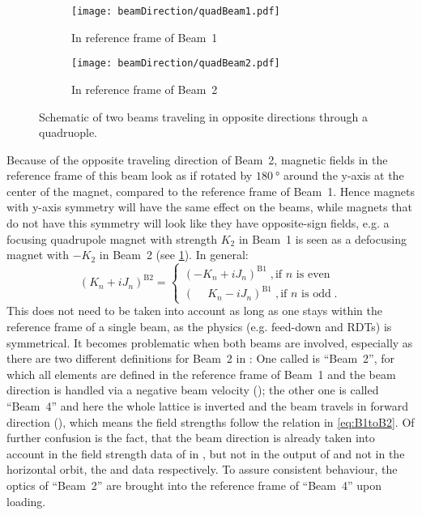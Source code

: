 \begin{figure}[h!]
    \centering
    \begin{subfigure}{0.4\textwidth}
        \texttt{[image: beamDirection/quadBeam1.pdf]}
        \caption{In reference frame of Beam~1}
    \end{subfigure}
    \hspace{2em}
    \begin{subfigure}{0.4\textwidth}
        \texttt{[image: beamDirection/quadBeam2.pdf]}
        \caption{In reference frame of Beam~2}
    \end{subfigure}
    \caption{Schematic of two beams traveling in opposite directions through a quadruople.}
    \label{fig:BeamDirection}
\end{figure}

Because of the opposite traveling direction of Beam~2, magnetic fields in the reference frame of this beam look as if rotated
by $\qty{180}{\degree}$ around the y-axis at the center of the magnet, compared to the reference frame of Beam~1.
Hence magnets with y-axis symmetry will have the same effect on the beams, 
while magnets that do not have this symmetry will look like they have opposite-sign fields,
e.g. a focusing quadrupole magnet with strength $K_2$ in Beam~1 is seen as a defocusing magnet with $-K_2$ in Beam~2 
(see \cref{fig:BeamDirection}).
%
In general:
%
\begin{equation}
\label{eq:B1toB2}
(K_n + iJ_n)^\text{B2} =
\begin{cases}
        (-K_n + iJ_n)^\text{B1} \; , \text{if } n \text{ is even} \\
        (\phantom{-}K_n - iJ_n)^\text{B1} \; , \text{if } n \text{ is odd} \;.
\end{cases}
\end{equation}
%
This does not need to be taken into account as long as one stays within the reference frame of a single beam, 
as the physics (e.g. feed-down and RDTs) is symmetrical.
It becomes problematic when both beams are involved, especially as there are two different definitions for Beam~2 in : 
One called is ``Beam~2'', for which all elements are defined in the reference frame of Beam~1 
and the beam direction is handled via a negative beam velocity (); 
the other one is called ``Beam~4'' and here the whole lattice is inverted and the beam travels in forward direction (),
which means the field strengths follow the relation in \cref{eq:B1toB2}.
Of further confusion is the fact, that the beam direction is already taken into account in the field strength data of  
in , but not in the  output of  and not in the horizontal orbit, the  and  data respectively.
To assure consistent behaviour, the optics of ``Beam~2'' are brought into the reference frame of ``Beam~4'' upon loading.

